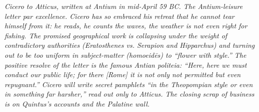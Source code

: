 
\textit{Cicero to Atticus, written at Antium in mid-April
59 BC. The Antium-leisure letter par excellence. Cicero
has so embraced his retreat that he cannot tear himself
from it: he reads, he counts the waves, the weather is
not even right for fishing. The promised geographical
work is collapsing under the weight of contradictory
authorities (Eratosthenes vs. Serapion and Hipparchus)
and turning out to be too uniform in subject-matter
\textit{(homoeid\=es)} to ``flower with style.'' The
positive resolve of the letter is the famous Antian
politeia: ``Here, here we must conduct our public life;
for there [Rome] it is not only not permitted but even
repugnant.'' Cicero will write secret pamphlets ``in the
Theopompian style or even in something far harsher,''
read out only to Atticus. The closing scrap of business
is on Quintus's accounts and the Palatine wall.}
